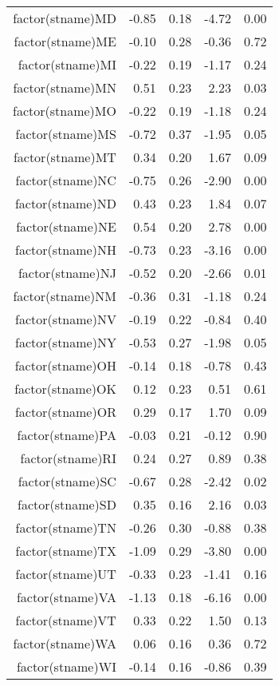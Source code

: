 \begin{table}[ht]
\begin{tabular}{rrrrr}
  factor(stname)MD & -0.85 & 0.18 & -4.72 & 0.00 \\ 
  factor(stname)ME & -0.10 & 0.28 & -0.36 & 0.72 \\ 
  factor(stname)MI & -0.22 & 0.19 & -1.17 & 0.24 \\ 
  factor(stname)MN & 0.51 & 0.23 & 2.23 & 0.03 \\ 
  factor(stname)MO & -0.22 & 0.19 & -1.18 & 0.24 \\ 
  factor(stname)MS & -0.72 & 0.37 & -1.95 & 0.05 \\ 
  factor(stname)MT & 0.34 & 0.20 & 1.67 & 0.09 \\ 
  factor(stname)NC & -0.75 & 0.26 & -2.90 & 0.00 \\ 
  factor(stname)ND & 0.43 & 0.23 & 1.84 & 0.07 \\ 
  factor(stname)NE & 0.54 & 0.20 & 2.78 & 0.00 \\ 
  factor(stname)NH & -0.73 & 0.23 & -3.16 & 0.00 \\ 
  factor(stname)NJ & -0.52 & 0.20 & -2.66 & 0.01 \\ 
  factor(stname)NM & -0.36 & 0.31 & -1.18 & 0.24 \\ 
  factor(stname)NV & -0.19 & 0.22 & -0.84 & 0.40 \\ 
  factor(stname)NY & -0.53 & 0.27 & -1.98 & 0.05 \\ 
  factor(stname)OH & -0.14 & 0.18 & -0.78 & 0.43 \\ 
  factor(stname)OK & 0.12 & 0.23 & 0.51 & 0.61 \\ 
  factor(stname)OR & 0.29 & 0.17 & 1.70 & 0.09 \\ 
  factor(stname)PA & -0.03 & 0.21 & -0.12 & 0.90 \\ 
  factor(stname)RI & 0.24 & 0.27 & 0.89 & 0.38 \\ 
  factor(stname)SC & -0.67 & 0.28 & -2.42 & 0.02 \\ 
  factor(stname)SD & 0.35 & 0.16 & 2.16 & 0.03 \\ 
  factor(stname)TN & -0.26 & 0.30 & -0.88 & 0.38 \\ 
  factor(stname)TX & -1.09 & 0.29 & -3.80 & 0.00 \\ 
  factor(stname)UT & -0.33 & 0.23 & -1.41 & 0.16 \\ 
  factor(stname)VA & -1.13 & 0.18 & -6.16 & 0.00 \\ 
  factor(stname)VT & 0.33 & 0.22 & 1.50 & 0.13 \\ 
  factor(stname)WA & 0.06 & 0.16 & 0.36 & 0.72 \\ 
  factor(stname)WI & -0.14 & 0.16 & -0.86 & 0.39 \\ 

\end{tabular}
\end{table}
